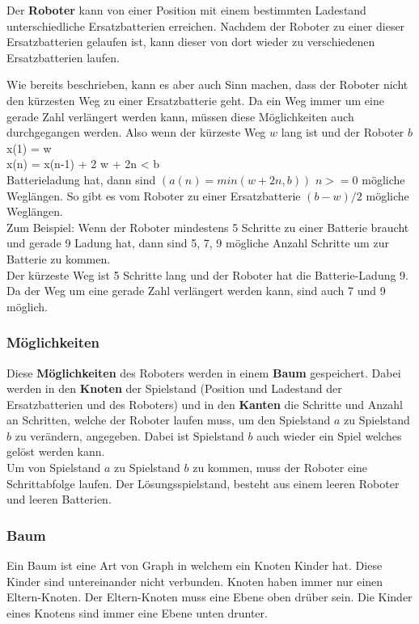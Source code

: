 \documentclass[a4paper,12pt,arial]{scrartcl}
\begin{document}
Der \textbf{Roboter} kann von einer Position mit einem bestimmten Ladestand unterschiedliche Ersatzbatterien erreichen. Nachdem der Roboter zu einer dieser Ersatzbatterien gelaufen ist, kann dieser von dort wieder zu verschiedenen Ersatzbatterien laufen.
\par
Wie bereits beschrieben, kann es aber auch Sinn machen, dass der Roboter nicht den kürzesten Weg zu einer Ersatzbatterie geht. Da ein Weg immer um eine gerade Zahl verlängert werden kann, müssen diese Möglichkeiten auch durchgegangen werden.
Also wenn der kürzeste Weg $w$ lang ist und der Roboter $b$
\\
x(1) = w \\
x(n) = x(n-1) + 2  {w + 2n < b}\\
Batterieladung hat, dann sind $(a(n)  = min(w + 2n, b))$ $n >= 0$ mögliche Weglängen.
So gibt es vom Roboter zu einer Ersatzbatterie $(b - w) / 2$ mögliche Weglängen.
\\
Zum Beispiel:
Wenn der Roboter mindestens 5 Schritte zu einer Batterie braucht und gerade 9 Ladung hat, dann sind 5, 7, 9 mögliche Anzahl Schritte um zur Batterie zu kommen.
\\
Der kürzeste Weg ist 5 Schritte lang und der Roboter hat die Batterie-Ladung 9. Da der Weg um eine gerade Zahl verlängert werden kann, sind auch 7 und 9 möglich.

\subsubsection{Möglichkeiten}

Diese \textbf{Möglichkeiten} des Roboters werden in einem \textbf{Baum} gespeichert.
Dabei werden in den \textbf{Knoten} der Spielstand (Position und Ladestand der Ersatzbatterien und des Roboters) und in den \textbf{Kanten} die Schritte und Anzahl an Schritten, welche der Roboter laufen muss, um den Spielstand $a$ zu Spielstand $b$ zu verändern, angegeben.
Dabei ist Spielstand $b$ auch wieder ein Spiel welches gelöst werden kann.
\\
Um von Spielstand $a$ zu Spielstand $b$ zu kommen, muss der Roboter eine Schrittabfolge laufen.
Der Lösungsspielstand, besteht aus einem leeren Roboter und leeren Batterien.

\par
\subsubsection{Baum}
Ein Baum ist eine Art von Graph in welchem ein Knoten Kinder hat. Diese Kinder sind untereinander nicht verbunden.
Knoten haben immer nur einen Eltern-Knoten. Der Eltern-Knoten muss eine Ebene oben drüber sein. Die Kinder eines Knotens sind immer eine Ebene unten drunter.
\end{document}
